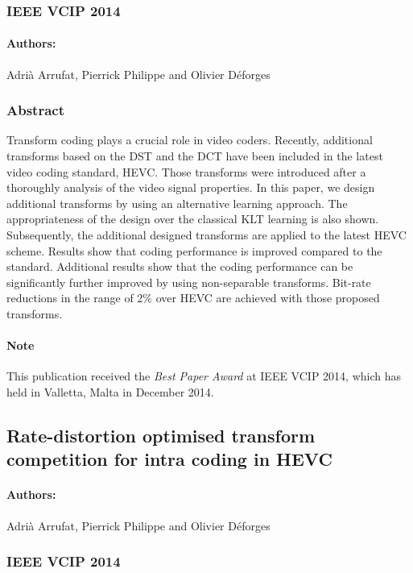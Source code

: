 \documentclass[11pt,a4paper,openright,twoside]{book}
\numberwithin{equation}{section} %
\numberwithin{figure}{section} %
\numberwithin{table}{section} %
\begin{document}
\subsubsection*{IEEE VCIP 2014}
\paragraph{\textsf{Authors:}}
	Adrià Arrufat, Pierrick Philippe and Olivier Déforges
\subsubsection*{Abstract}

Transform coding plays a crucial role in video coders.
Recently, additional transforms based on the \acs{DST} and the \acs{DCT} have
been included in the latest video coding standard, \acs{HEVC}.
Those transforms were introduced after a thoroughly analysis of the video
signal properties.
In this paper, we design additional transforms by using an alternative
learning approach.
The appropriateness of the design over the classical \acs{KLT} learning is
also shown.
Subsequently, the additional designed transforms are applied to the latest
\acs{HEVC} scheme.
Results show that coding performance is improved compared to the standard.
Additional results show that the coding performance can be significantly
further improved by using non-separable transforms.
Bit-rate reductions in the range of 2\% over \acs{HEVC} are achieved with
those proposed transforms.

\paragraph{Note}
\label{par:note}
This publication received the \emph{Best Paper Award} at IEEE VCIP 2014, which
has held in Valletta, Malta in December 2014.

\subsection*{Rate-distortion optimised transform competition for intra coding in
HEVC}
\paragraph{\textsf{Authors:}}
	Adrià Arrufat, Pierrick Philippe and Olivier Déforges
\subsubsection*{IEEE VCIP 2014}
\label{sub:ieee_vcip_2014_tc}
\end{document}
